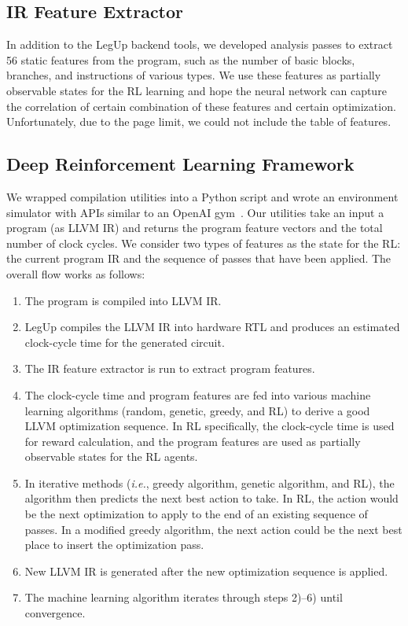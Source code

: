 \subsection{IR Feature Extractor}
In addition to the LegUp backend tools, we developed analysis passes to extract 56 static features from the program, such as the number of basic blocks, branches, and instructions of various types. 
We use these features as partially observable states for the RL learning and hope the neural network can capture the correlation of certain combination of these features and certain optimization. Unfortunately, due to the page limit, we could not include the table of features. 

\subsection{Deep Reinforcement Learning Framework}
We wrapped compilation utilities into a Python script and wrote an environment simulator with APIs similar to an OpenAI gym~\cite{brockman2016openai}. Our utilities take an input a program (as LLVM IR) and returns the program feature vectors and the total number of clock cycles. We consider two types of features as the state for the RL: the current program IR and the sequence of passes that have been applied. The overall flow works as follows:
\begin{enumerate}
\item The program is compiled into LLVM IR. 
\item LegUp compiles the LLVM IR into hardware RTL and produces an estimated clock-cycle time for the generated circuit. 
\item The IR feature extractor is run to extract program features. 
\item The clock-cycle time and program features are fed into various machine learning algorithms (random, genetic, greedy, and RL) to derive a good LLVM optimization sequence. In RL specifically, the clock-cycle time is used for reward calculation, and the program features are used as partially observable states for the RL agents. 
\item In iterative methods (\textit{i.e.}, greedy algorithm, genetic algorithm, and RL), the algorithm then predicts the next best action to take. In RL, the action would be the next optimization to apply to the end of an existing sequence of passes. In a modified greedy algorithm, the next action could be the next best place to insert the optimization pass.
\item New LLVM IR is generated after the new optimization sequence is applied. 
\item The machine learning algorithm iterates through steps 2)--6) until convergence.
\end{enumerate}


